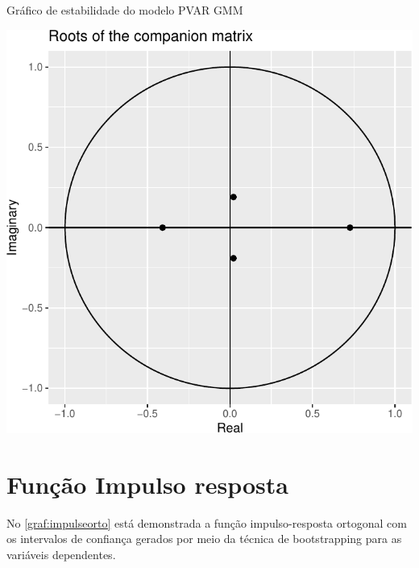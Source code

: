 \documentclass[
  12pt,
  12pt,
  openright,
  oneside,
  a4paper,
  chapter=TITLE,
  section=TITLE,
  subsection=TITLE,
  subsubsection=TITLE,
  english,
  portugues,
  sumario=tradicional]{abntex2}
\begin{document}
\begin{grafico}[!hbtp]
\vspace{20pt}
\caption{Gráfico de estabilidade do modelo PVAR GMM}
\vspace{-4mm}

\begin{center}\includegraphics{12-exportedfigures/stability.plot-1} \end{center}
\vspace{-3mm}
\label{graf:stability}
\vspace{-2mm}
\end{grafico}

\vspace{20pt}

\section{Função Impulso resposta}

No \autoref{graf:impulseorto} está demonstrada a função impulso-resposta ortogonal com os intervalos de confiança gerados por meio da técnica de bootstrapping para as variáveis dependentes.

\vspace{20pt}
\end{document}
